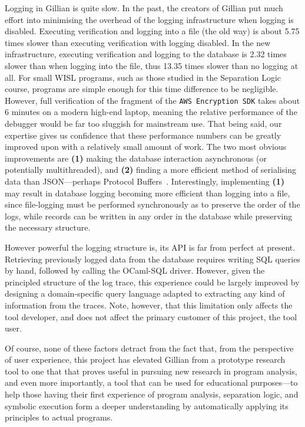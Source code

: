Logging in Gillian is quite slow. In the past, the creators of Gillian put much
effort into minimising the overhead of the logging infrastructure when logging
is disabled. Executing verification and logging into a file (the old way) is
about 5.75\footnotemark[1]{} times slower than executing verification with
logging disabled. In the new infrastructure, executing verification and logging
to the database is 2.32\footnotemark[1]{} times slower than when logging into
the file, thus 13.35\footnotemark[1]{} times slower than no logging at all.
For small WISL programs, such as those studied in the Separation Logic course,
programs are simple enough for this time difference to be negligible. However,
full verification of the fragment of the \texttt{AWS Encryption SDK} takes about
6 minutes on a modern high-end laptop, meaning the relative performance of the
debugger would be far too sluggish for mainstream use.  That being said,
our expertise gives us confidence that these performance numbers can be
greatly improved upon with a relatively small amount of work.
The two most obvious improvements are \textbf{(1)} making the database
interaction asynchronous (or potentially multithreaded), and \textbf{(2)}
finding a more efficient method of serialising data than JSON---perhaps
Protocol Buffers~\cite{protobuf}. Interestingly, implementing \textbf{(1)} may
result in database logging becoming more efficient than logging into a file,
since file-logging must be performed synchronously as to preserve the order of
the logs, while records can be written in any order in the database while
preserving the necessary structure.

However powerful the logging structure is, its API is far from perfect at
present. Retrieving previously logged data from the database requires writing
SQL queries by hand, followed by calling the OCaml-SQL driver. However, given
the principled structure of the log trace, this experience could be largely
improved by designing a domain-specific query language adapted to extracting any
kind of information from the traces. Note, however, that this limitation only
affects the tool developer, and does not affect the primary customer of this
project, the tool user.

Of course, none of these factors detract from the fact that, from the
perspective of user experience, this project has elevated Gillian from a
prototype research tool to one that that proves useful in pursuing new research
in program analysis, and even more importantly, a tool that can be used for
educational purposes---to help those having their first experience of
program analysis, separation logic, and symbolic execution form a deeper
understanding by automatically applying its principles to actual programs.
